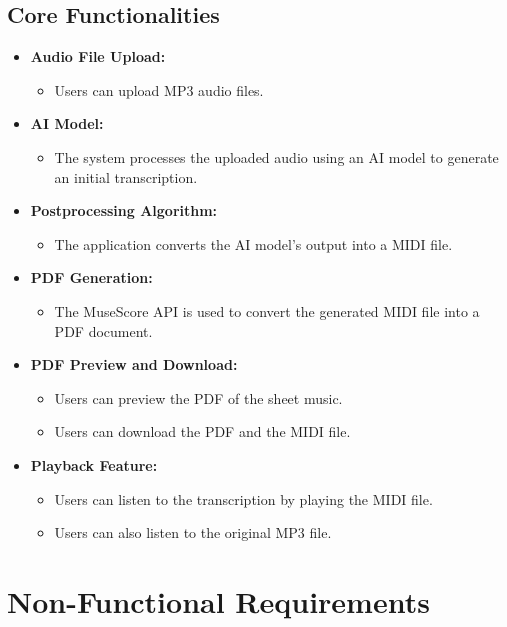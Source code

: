 \documentclass{article}
\begin{document}
\subsection{Core Functionalities}
\begin{itemize}
    \item \textbf{Audio File Upload:}
    \begin{itemize}
        \item Users can upload MP3 audio files.
    \end{itemize}
    \item \textbf{AI Model:}
    \begin{itemize}
        \item The system processes the uploaded audio using an AI model to generate an initial transcription.
    \end{itemize}
    \item \textbf{Postprocessing Algorithm:}
    \begin{itemize}
        \item The application converts the AI model's output into a MIDI file.
    \end{itemize}
    \item \textbf{PDF Generation:}
    \begin{itemize}
        \item The MuseScore API is used to convert the generated MIDI file into a PDF document.
    \end{itemize}
    \item \textbf{PDF Preview and Download:}
    \begin{itemize}
        \item Users can preview the PDF of the sheet music.
        \item Users can download the PDF and the MIDI file.
    \end{itemize}
    \item \textbf{Playback Feature:}
    \begin{itemize}
        \item Users can listen to the transcription by playing the MIDI file.
        \item Users can also listen to the original MP3 file.
    \end{itemize}
\end{itemize}

\section{Non-Functional Requirements}
\end{document}
